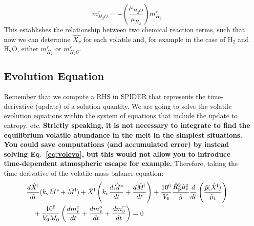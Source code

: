 \begin{equation}
m_{H_2O}^r = - \left( \frac{\mu_{H_2O}}{\mu_{H_2}} \right) m_{H_2}^r
\label{eq:mvr_final}
\end{equation}
This establishes the relationship between two chemical reaction terms, such that now we can determine $\hat{X_v}$ for each volatile and, for example in the case of H$_2$ and H$_2$O, either $m_{H_2}^r$ or $m_{H_2O}^r$.  
\subsection{Evolution Equation}
Remember that we compute a RHS in SPIDER that represents the time-derivative (update) of a solution quantity.  We are going to solve the volatile evolution equations within the system of equations that include the update to entropy, etc.  \textbf{Strictly speaking, it is not necessary to integrate to find the equilibrium volatile abundance in the melt in the simplest situations.  You could save computations (and accumulated error) by instead solving Eq.~\ref{eq:volevo}, but this would not allow you to introduce time-dependent atmospheric escape for example.}  Therefore, taking the time derivative of the volatile mass balance equation:
\begin{align}
&\frac{d \hat{X}^{\rm l}}{d t} (k_{\rm v} \hat{M}^{\rm s} + \hat{M}^{\rm l}) + \hat{X}^{\rm l} \left( k_{\rm v} \frac{d \hat{M}^{\rm s}}{d t} + \frac{d \hat{M}^{\rm l}}{d t} \right) + \frac{10^6}{V_0} \frac{\hat{R}_{\rm p}^2 \hat{\mu}_{\rm v}^{\rm g}}{\hat{g}} \frac{d}{dt} \left( \frac{\hat{p}(\hat{X}^{\rm l})}{\hat{\mu}_{\rm t}} \right)\\
&\quad + \frac{10^6}{V_0 M_0} \left( \frac{dm_v^e}{dt} +  \frac{dm_v^o}{dt} + \frac{dm_v^r}{dt} \right) = 0
\end{align}
